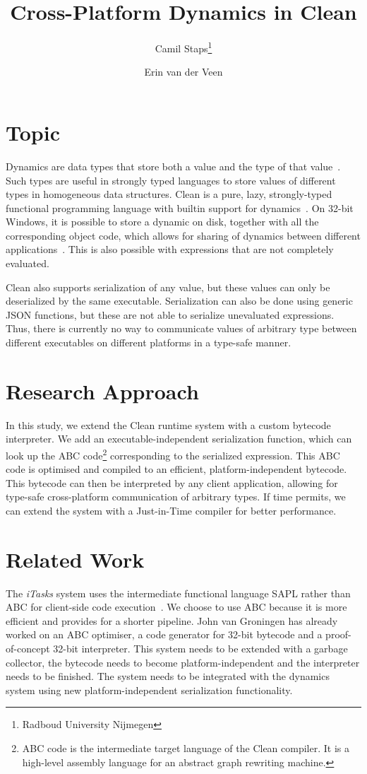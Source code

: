 \documentclass[a4paper]{article}
\title{Cross-Platform Dynamics in Clean}
\author{Camil Staps\footnote{Radboud University Nijmegen} \and Erin van der Veen\footnotemark[1]}
\begin{document}
\maketitle

\section*{Topic}
Dynamics are data types that store both a value and the type of that value~\cites{Abadi1991,Leroy1993,Abadi1995,Pil1998}.
Such types are useful in strongly typed languages to store values of different types in homogeneous data structures.
Clean is a pure, lazy, strongly-typed functional programming language with builtin support for dynamics~\citep{CleanLang}.
On 32-bit Windows, it is possible to store a dynamic on disk, together with all the corresponding object code,
	which allows for sharing of dynamics between different applications~\citep{Vervoort2002}.
This is also possible with expressions that are not completely evaluated.

Clean also supports serialization of any value, but these values can only be deserialized by the same executable.
Serialization can also be done using generic JSON functions, but these are not able to serialize unevaluated expressions.
Thus, there is currently no way to communicate values of arbitrary type between different executables on different platforms in a type-safe manner.

\section*{Research Approach}
In this study, we extend the Clean runtime system with a custom bytecode interpreter.
We add an executable-independent serialization function,
	which can look up the ABC code\footnote{ABC code is the intermediate target language of the Clean compiler. It is a high-level assembly language for an abstract graph rewriting machine.} corresponding to the serialized expression.
This ABC code is optimised and compiled to an efficient, platform-independent bytecode.
This bytecode can then be interpreted by any client application, allowing for type-safe cross-platform communication of arbitrary types.
If time permits, we can extend the system with a Just-in-Time compiler for better performance.

\section*{Related Work}
The \emph{iTasks} system uses the intermediate functional language SAPL rather than ABC for client-side code execution~\cites{Jansen2006,Plasmeijer2008}.
We choose to use ABC because it is more efficient and provides for a shorter pipeline.
John van Groningen has already worked on an ABC optimiser, a code generator for 32-bit bytecode and a proof-of-concept 32-bit interpreter.
This system needs to be extended with a garbage collector, the bytecode needs to become platform-independent and the interpreter needs to be finished.
The system needs to be integrated with the dynamics system using new platform-independent serialization functionality.

\footnotesize
\printbibliography
\end{document}
